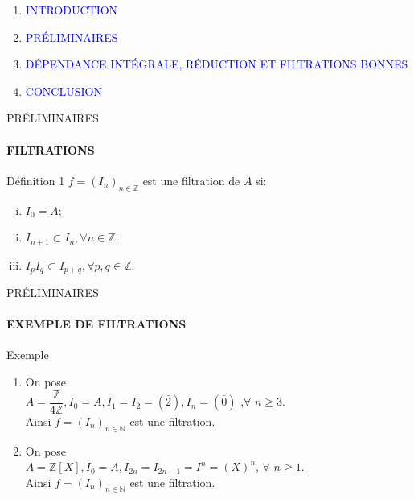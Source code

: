 \documentclass[11pt,a4paper]{beamer}
\begin{document}
		\begin{frame}
		\begin{enumerate}
			\item<0> \textcolor{blue}{INTRODUCTION}\\
			\item<1> \textcolor{blue}{PRÉLIMINAIRES}\\
			\item<0> \textcolor{blue}{DÉPENDANCE INTÉGRALE, RÉDUCTION ET FILTRATIONS BONNES }\\
			\item<0> \textcolor{blue}{CONCLUSION}\\
		\end{enumerate}
	\end{frame}
	
	\begin{frame}{PRÉLIMINAIRES}
		\framesubtitle{FILTRATIONS}
		\begin{block}{Définition 1}
				$f=(I_n)_{n \in \mathbb{Z}}$ est une filtration de $A$ si: 
				\begin{enumerate}[(i)]
					\item $I_0 = A$;
					\item $I_{n+1} \subset I_n, \forall n \in \mathbb{Z}$;
					\item $I_{p}I_{q} \subset I_{p+q}, \forall p,q \in \mathbb{Z}$.
				\end{enumerate}
		\end{block}
	\end{frame}
		\begin{frame}{PRÉLIMINAIRES}
		\framesubtitle{EXEMPLE DE FILTRATIONS}
		\begin{alertblock}{Exemple}
			\begin{enumerate}[(1)]
				\item On pose \\ $A= \dfrac{\mathbb{Z}}{4\mathbb{Z}}, I_0 = A, I_1=I_2 = (\bar{2}), I_n = (\bar{0})$ ,$\forall$ $n \geqslant 3.$ \\ Ainsi $f=(I_n)_{n \in \mathbb{N}}$ est une filtration.
				\item On pose \\ $A= \mathbb{Z}[X], I_0 = A, I_{2n}=I_{2n-1} = I^n=(X)^n $, $\forall$ $n \geqslant 1.$ \\ Ainsi $f=(I_n)_{n \in \mathbb{N}}$ est une filtration.
			\end{enumerate}
		\end{alertblock}
	\end{frame}
	
\end{document}
